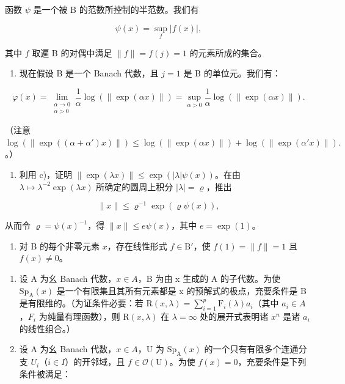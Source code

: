 函数 \(\psi\) 是一个被 B 的范数所控制的半范数。我们有

\[
\psi (x) = \sup _ {f} | f (x) |,
\]

其中 \(f\) 取遍 B 的对偶中满足 \(\|f\| = f(j) = 1\) 的元素所成的集合。

\begin{enumerate}
\def\labelenumi{\alph{enumi})}
\setcounter{enumi}{2}
\tightlist
\item
  现在假设 B 是一个 Banach 代数，且 \(j = 1\) 是 B 的单位元。我们有：
\end{enumerate}

\[
\varphi (x) = \lim_{\substack{\alpha \to 0\\ \alpha >0}}\frac{1}{\alpha}\log (\| \exp (\alpha x)\|) = \sup_{\alpha >0}\frac{1}{\alpha}\log (\| \exp (\alpha x)\|).
\]

（注意 \(\log(\|\exp((\alpha+\alpha')x)\|) \leqslant \log(\|\exp(\alpha x)\|) + \log(\|\exp(\alpha' x)\|).\)。）

\begin{enumerate}
\def\labelenumi{\alph{enumi})}
\setcounter{enumi}{3}
\tightlist
\item
  利用 c)，证明 \(\|\exp(\lambda x)\| \leqslant \exp(|\lambda|\psi(x))\)。在由 \(\lambda \mapsto \lambda^{-2} \exp(\lambda x)\) 所确定的圆周上积分 \(|\lambda| = \varrho\)，推出
\end{enumerate}

\[
\| x \| \leqslant \varrho^ {- 1} \exp (\varrho \psi (x)),
\]

从而令 \(\varrho = \psi(x)^{-1}\)，得 \(\|x\| \leqslant e\psi(x)\)，其中 \(e = \exp(1)\)。

\begin{enumerate}
\def\labelenumi{\alph{enumi})}
\setcounter{enumi}{4}
\tightlist
\item
  对 B 的每个非零元素 \(x\)，存在线性形式 \(f \in \mathrm{B}'\)，使 \(f(1) = \| f \| = 1\) 且 \(f(x) \neq 0\)。
\end{enumerate}

\begin{enumerate}
\def\labelenumi{\arabic{enumi})}
\setcounter{enumi}{7}
\item
  设 A 为幺 Banach 代数，\(x \in A\)，B 为由 x 生成的 A 的子代数。为使 \(\mathrm{Sp}_{\mathrm{A}}(x)\) 是一个有限集且其所有元素都是 x 的预解式的极点，充要条件是 B 是有限维的。（为证条件必要：若 \(\mathrm{R}(x, \lambda) = \sum_{i=1}^{p} \mathrm{F}_{i}(\lambda) a_{i}\)（其中 \(a_{i} \in A\)，\(F_{i}\) 为纯量有理函数），则 \(\mathrm{R}(x, \lambda)\) 在 \(\lambda = \infty\) 处的展开式表明诸 \(x^{n}\) 是诸 \(a_{i}\) 的线性组合。）
\item
  设 A 为幺 Banach 代数，\(x \in A\)，U 为 \(\mathrm{Sp}_{\mathrm{A}}(x)\) 的一个只有有限多个连通分支 \(U_{i}\)（\(i \in I\)）的开邻域，且 \(f \in \mathcal{O}(\mathrm{U})\)。为使 \(f(x) = 0\)，充要条件是下列条件被满足：
\end{enumerate}

